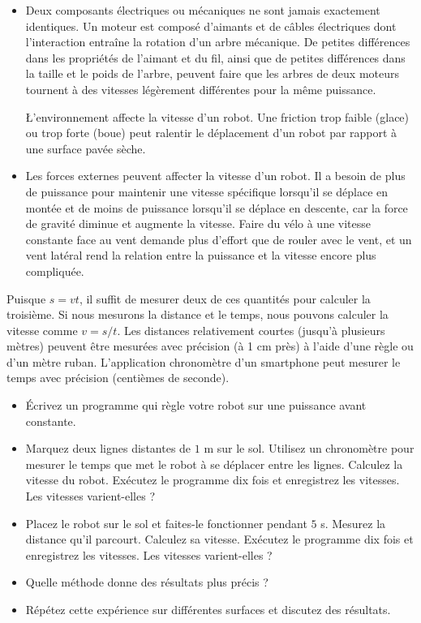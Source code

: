 \begin{itemize}
\item Deux composants électriques ou mécaniques ne sont jamais exactement identiques. Un moteur est composé d'aimants et de câbles électriques dont l'interaction entraîne la rotation d'un arbre mécanique. De petites différences dans les propriétés de l'aimant et du fil, ainsi que de petites différences dans la taille et le poids de l'arbre, peuvent faire que les arbres de deux moteurs tournent à des vitesses légèrement différentes pour la même puissance.

\L'environnement affecte la vitesse d'un robot. Une friction trop faible (glace) ou trop forte (boue) peut ralentir le déplacement d'un robot par rapport à une surface pavée sèche.

\item Les forces externes peuvent affecter la vitesse d'un robot. Il a besoin de plus de puissance pour maintenir une vitesse spécifique lorsqu'il se déplace en montée et de moins de puissance lorsqu'il se déplace en descente, car la force de gravité diminue et augmente la vitesse. Faire du vélo à une vitesse constante face au vent demande plus d'effort que de rouler avec le vent, et un vent latéral rend la relation entre la puissance et la vitesse encore plus compliquée.
\end{itemize}

Puisque $s=vt$, il suffit de mesurer deux de ces quantités pour calculer la troisième. Si nous mesurons la distance et le temps, nous pouvons calculer la vitesse comme $v=s/t$. Les distances relativement courtes (jusqu'à plusieurs mètres) peuvent être mesurées avec précision (à 1 cm près) à l'aide d'une règle ou d'un mètre ruban. L'application chronomètre d'un smartphone peut mesurer le temps avec précision (centièmes de seconde).

\begin{framed}
\begin{itemize}
\item Écrivez un programme qui règle votre robot sur une puissance avant constante.
\item Marquez deux lignes distantes de $1$ m sur le sol. Utilisez un chronomètre pour mesurer le temps que met le robot à se déplacer entre les lignes. Calculez la vitesse du robot. Exécutez le programme dix fois et enregistrez les vitesses. Les vitesses varient-elles ?
\item Placez le robot sur le sol et faites-le fonctionner pendant $5$ s. Mesurez la distance qu'il parcourt. Calculez sa vitesse. Exécutez le programme dix fois et enregistrez les vitesses. Les vitesses varient-elles ?
\item Quelle méthode donne des résultats plus précis ?
\item Répétez cette expérience sur différentes surfaces et discutez des résultats.
\end{itemize}
\end{framed}

